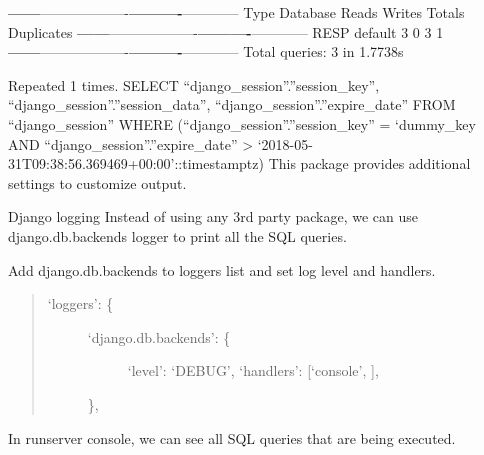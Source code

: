 \documentclass[letterpaper,11pt,english]{sphinxmanual}
\begin{document}
{\color{red}\bfseries{}\textbar{}------\textbar{}}———\textendash{}{\color{red}\bfseries{}\textbar{}----------\textbar{}}———-{\color{red}\bfseries{}\textbar{}----------\textbar{}}————\textbar{}
\textbar{} Type \textbar{} Database  \textbar{}   Reads  \textbar{}  Writes  \textbar{}  Totals  \textbar{} Duplicates \textbar{}
{\color{red}\bfseries{}\textbar{}------\textbar{}}———\textendash{}{\color{red}\bfseries{}\textbar{}----------\textbar{}}———-{\color{red}\bfseries{}\textbar{}----------\textbar{}}————\textbar{}
\textbar{} RESP \textbar{}  default  \textbar{}    3     \textbar{}    0     \textbar{}    3     \textbar{}     1      \textbar{}
{\color{red}\bfseries{}\textbar{}------\textbar{}}———\textendash{}{\color{red}\bfseries{}\textbar{}----------\textbar{}}———-{\color{red}\bfseries{}\textbar{}----------\textbar{}}————\textbar{}
Total queries: 3 in 1.7738s

Repeated 1 times.
SELECT “django\_session”.”session\_key”,
“django\_session”.”session\_data”, “django\_session”.”expire\_date” FROM
“django\_session” WHERE (“django\_session”.”session\_key” =
‘dummy\_key AND “django\_session”.”expire\_date”
\textgreater{} ‘2018-05-31T09:38:56.369469+00:00’::timestamptz)
This package provides additional settings to customize output.

Django logging
Instead of using any 3rd party package, we can use django.db.backends logger to print all the SQL queries.

Add django.db.backends to loggers list and set log level and handlers.
\begin{quote}
\begin{description}
\item[{‘loggers’: \{}] \leavevmode\begin{description}
\item[{‘django.db.backends’: \{}] \leavevmode
‘level’: ‘DEBUG’,
‘handlers’: {[}‘console’, {]},

\end{description}

\},

\end{description}
\end{quote}

In runserver console, we can see all SQL queries that are being executed.
\end{document}

